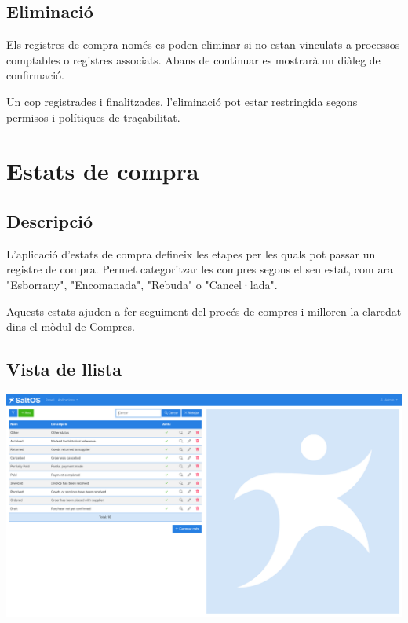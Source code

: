 \documentclass[a4paper]{article}
\begin{document}
\hypertarget{toc120}{}
\subsection{Eliminació}

Els registres de compra només es poden eliminar si no estan vinculats a processos comptables o registres associats.
Abans de continuar es mostrarà un diàleg de confirmació.

Un cop registrades i finalitzades, l'eliminació pot estar restringida segons permisos i polítiques de traçabilitat.


\hypertarget{toc121}{}
\section{Estats de compra}

\hypertarget{toc122}{}
\subsection{Descripció}

L'aplicació d'estats de compra defineix les etapes per les quals pot passar un registre de compra.
Permet categoritzar les compres segons el seu estat, com ara "Esborrany", "Encomanada", "Rebuda" o "Cancel·lada".

Aquests estats ajuden a fer seguiment del procés de compres i milloren la claredat dins el mòdul de Compres.

\hypertarget{toc123}{}
\subsection{Vista de llista}

\begin{center}\includegraphics[width=1\textwidth]{../ujest/snaps/test-screenshots-js-screenshots-purchases-purchase-status-list-ca-es-1-snap.png}\end{center}
\end{document}
